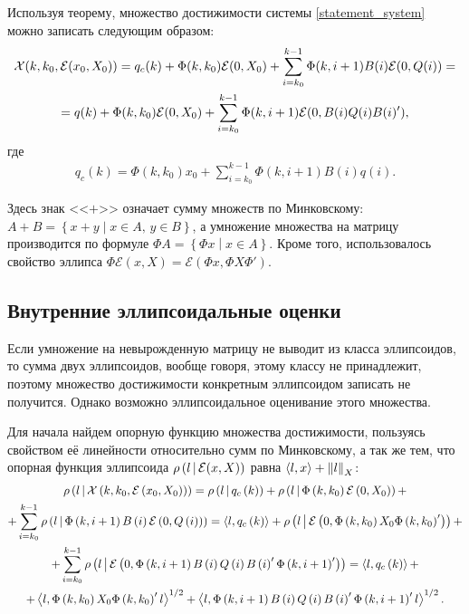 \documentclass[10pt, a4paper]{article}
\renewcommand{\ell}{\mathcal{E}}
\begin{document}
\begin{imp}
	Используя теорему, множество достижимости системы \eqref{statement_system} можно записать следующим образом:
	\begin{gather}
		\notag \mathcal{X}(k,k_0,\ell(x_0,X_0)) = q_c(k) + \Phi(k,k_0)\ell(0,X_0) + 
			\sum\limits_{i=k_0}^{k-1}\Phi(k,i+1)B(i)\ell(0,Q(i)) = \\
		= q(k) + \Phi(k,k_0)\ell(0,X_0) + 
			\sum\limits_{i=k_0}^{k-1}\Phi(k,i+1)\ell(0,B(i)Q(i)B(i)'),
	\end{gather}
	где \begin{gather}
		q_c(k) = \Phi(k,k_0)x_0 + \sum\limits_{i=k_0}^{k-1}\Phi(k,i+1)B(i)q(i).
	\end{gather}
\end{imp}
Здесь знак <<$+$>> означает сумму множеств по Минковскому: $A+B= \left\{x+y \middle| x\in A,\, y\in B\right\}$, а умножение множества на матрицу производится по формуле $\Phi A = \left\{ \Phi x\middle| x\in A \right\}.$ Кроме того, использовалось свойство эллипса $\Phi\ell(x,X) = \ell(\Phi x,\Phi X\Phi')$.
\subsection{Внутренние эллипсоидальные оценки}
Если умножение на невырожденную матрицу не выводит из класса эллипсоидов, то сумма двух эллипсоидов, вообще говоря, этому классу не принадлежит, поэтому множество достижимости конкретным эллипсоидом записать не получится. Однако возможно эллипсоидальное оценивание этого множества.

Для начала найдем опорную функцию множества достижимости, пользуясь свойством её линейности относительно сумм по Минковскому, а так же тем, что опорная функция эллипсоида $\sufu{l}{\ell(x,X)}$ равна $\left<l,x\right>+\left\| l \right\|_X$:
\begin{gather}
\notag\sufu{l}{\mathcal{X}\left(k,k_0,\ell\left(x_0,X_0\right)\right)} = \sufu{l}{q_c\left(k\right)} + \sufu{l}{\Phi\left(k,k_0\right)\ell\left(0,X_0\right)} +\\ 
			\notag + 
			 \sum\limits_{i=k_0}^{k-1}\sufu{l}{\Phi\left(k,i+1\right)B\left(i\right)\ell\left(0,Q\left(i\right)\right)} = 
			 \scalar{l}{q_c\left(k\right)} + 
				\sufu{l}{\ell\left(0,\Phi\left(k,k_0\right)X_0\Phi\left(k,k_0\right)'\right)} + \\
			\notag +\sum\limits_{i=k_0}^{k-1} 
				\sufu{l}{
					\ell\left(0,\Phi\left(k,i+1\right)B\left(i\right)Q\left(i\right)B\left(i\right)'\Phi\left(k,i+1\right)'\right)} = 
			 \scalar{l}{q_c\left(k\right)} +\\+ \scalar{l}{\Phi\left(k,k_0\right)X_0\Phi\left(k,k_0\right)'l}^{1/2}
			  +
			\scalar{l}{\Phi\left(k,i+1\right)B\left(i\right)Q\left(i\right)B\left(i\right)'\Phi\left(k,i+1\right)'l}^{1/2}.
\end{gather}
\end{document}
